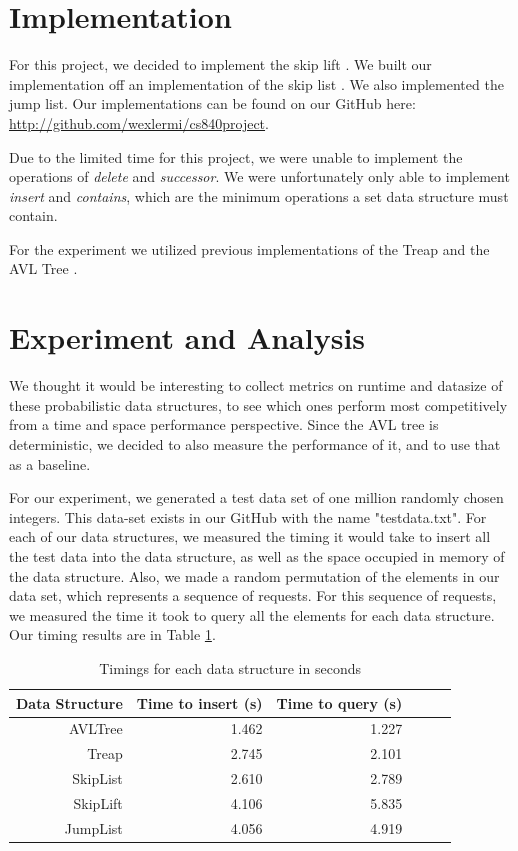 \documentclass[oribibl]{llncs}
\begin{document}
\section{Implementation}
\label{sctn:implementation}

For this project, we decided to implement the skip lift \cite{skip_lift}. We built our implementation off an implementation of the skip list \cite{skip_list_imp}. We also implemented the jump list\cite{jump_list}.  Our implementations can be found on our GitHub here: \url{http://github.com/wexlermi/cs840project}.

Due to the limited time for this project, we were unable to implement the operations of {\it delete} and {\it successor}. We were unfortunately only able to implement {\it insert} and {\it contains}, which are the minimum operations a set data structure must contain.

For the experiment we utilized previous implementations of the Treap \cite{treap_imp} and the AVL Tree \cite{avl_tree_imp}.

 \section{Experiment and Analysis}
\label{sctn:experiment}

We thought it would be interesting to collect metrics on runtime and datasize of these probabilistic data structures, to see which ones perform most competitively from a time and space performance perspective. Since the AVL tree is deterministic, we decided to also measure the performance of it, and to use that as a baseline.

For our experiment, we generated a test data set of one million randomly chosen integers. This data-set exists in our GitHub with the name "testdata.txt". For each of our data structures, we measured the timing it would take to insert all the test data into the data structure, as well as the space occupied in memory of the data structure. Also, we made a random permutation of the elements in our data set, which represents a sequence of requests. For this sequence of requests, we measured the time it took to query all the elements for each data structure. Our timing results are in Table \ref{table:timings}.

\begin{table}[htbp]
\caption{Timings for each data structure in seconds}
\begin{center}
\begin{tabular}{|r|r|r|r|r|r|}
\hline
Data Structure & Time to insert (s) & Time to query (s) \\ \hline
AVLTree & 1.462 & 1.227 \\ \hline
Treap &  2.745 & 2.101 \\ \hline
SkipList & 2.610 & 2.789 \\ \hline
SkipLift & 4.106 & 5.835  \\ \hline
JumpList & 4.056 & 4.919 \\ \hline
\end{tabular}
\end{center}
\label{table:timings}
\end{table}
\end{document}
